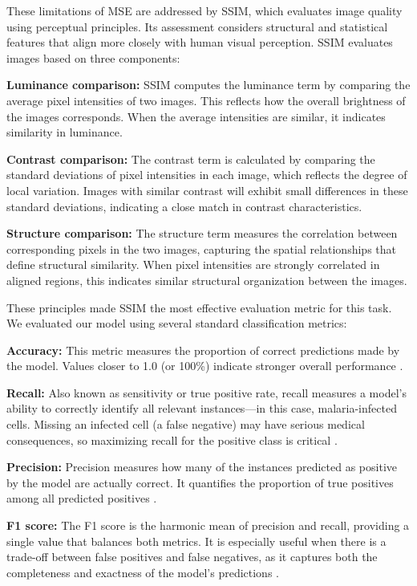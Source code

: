 \documentclass[journal,12pt,onecolumn,draftcls]{IEEEtran}
\begin{document}
These limitations of MSE are addressed by SSIM, which evaluates image quality using perceptual principles. Its assessment considers structural and statistical features that align more closely with human visual perception. SSIM evaluates images based on three components:

\textbf{Luminance comparison:} SSIM computes the luminance term by comparing the average pixel intensities of two images. This reflects how the overall brightness of the images corresponds. When the average intensities are similar, it indicates similarity in luminance.

\textbf{Contrast comparison:} The contrast term is calculated by comparing the standard deviations of pixel intensities in each image, which reflects the degree of local variation. Images with similar contrast will exhibit small differences in these standard deviations, indicating a close match in contrast characteristics.

\textbf{Structure comparison:} The structure term measures the correlation between corresponding pixels in the two images, capturing the spatial relationships that define structural similarity. When pixel intensities are strongly correlated in aligned regions, this indicates similar structural organization between the images.

These principles made SSIM the most effective evaluation metric for this task. We evaluated our model using several standard classification metrics:

\textbf{Accuracy:} This metric measures the proportion of correct predictions made by the model. Values closer to 1.0 (or 100\%) indicate stronger overall performance \cite{powers2011}.

\textbf{Recall:} Also known as sensitivity or true positive rate, recall measures a model’s ability to correctly identify all relevant instances—in this case, malaria-infected cells. Missing an infected cell (a false negative) may have serious medical consequences, so maximizing recall for the positive class is critical \cite{powers2011}.

\textbf{Precision:} Precision measures how many of the instances predicted as positive by the model are actually correct. It quantifies the proportion of true positives among all predicted positives \cite{powers2011}.

\textbf{F1 score:} The F1 score is the harmonic mean of precision and recall, providing a single value that balances both metrics. It is especially useful when there is a trade-off between false positives and false negatives, as it captures both the completeness and exactness of the model’s predictions \cite{powers2011}.
\end{document}
